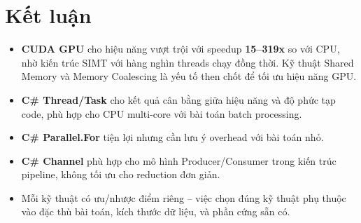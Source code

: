 \documentclass[12pt,a4paper]{article}
\begin{document}
\section{Kết luận}

\begin{itemize}
    \item \textbf{CUDA GPU} cho hiệu năng vượt trội với speedup \textbf{15--319x} so với CPU, nhờ kiến trúc SIMT với hàng nghìn threads chạy đồng thời. Kỹ thuật Shared Memory và Memory Coalescing là yếu tố then chốt để tối ưu hiệu năng GPU.

    \item \textbf{C\# Thread/Task} cho kết quả cân bằng giữa hiệu năng và độ phức tạp code, phù hợp cho CPU multi-core với bài toán batch processing.

    \item \textbf{C\# Parallel.For} tiện lợi nhưng cần lưu ý overhead với bài toán nhỏ.

    \item \textbf{C\# Channel} phù hợp cho mô hình Producer/Consumer trong kiến trúc pipeline, không tối ưu cho reduction đơn giản.

    \item Mỗi kỹ thuật có ưu/nhược điểm riêng -- việc chọn đúng kỹ thuật phụ thuộc vào đặc thù bài toán, kích thước dữ liệu, và phần cứng sẵn có.
\end{itemize}
\end{document}
